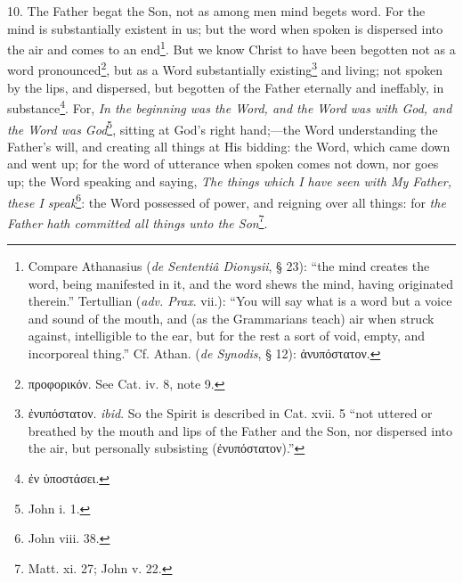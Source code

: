 10. The Father begat the Son, not as among men mind begets word. For the mind is substantially existent in us; but the word when spoken is dispersed into the air and comes to an end\footnote{Compare Athanasius (\emph{de Sententiâ Dionysii}, § 23): “the mind creates the word, being manifested in it, and the word shews the mind, having originated therein.” Tertullian (\emph{adv. Prax}. vii.): “You will say what is a word but a voice and sound of the mouth, and (as the Grammarians teach) air when struck against, intelligible to the ear, but for the rest a sort of void, empty, and incorporeal thing.” Cf. Athan. (\emph{de Synodis}, § 12): \textgreek{ἀνυπόστατον}.}. But we know Christ to have been begotten not as a word pronounced\footnote{\textgreek{προφορικόν}. See Cat. iv. 8, note 9.}, but as a Word substantially existing\footnote{\textgreek{ἐνυπόστατον}. \emph{ibid}. So the Spirit is described in Cat. xvii. 5 “not uttered or breathed by the mouth and lips of the Father and the Son, nor dispersed into the air, but personally subsisting (\textgreek{ἐνυπόστατον}).”} and living; not spoken by the lips, and dispersed, but begotten of the Father eternally and ineffably, in substance\footnote{\textgreek{ἐν ὑποστάσει}.}. For, \emph{In the beginning was the Word, and the Word was with God, and the Word was God}\footnote{John i. 1.}, sitting at God’s right hand;—the Word understanding the Father’s will, and creating all things at His bidding: the Word, which came down and went up; for the word of utterance when spoken comes not down, nor goes up; the Word speaking and saying, \emph{The things which I have seen with My Father, these I speak}\footnote{John viii. 38.}: the Word possessed of power, and reigning over all things: for \emph{the Father hath committed all things unto the Son}\footnote{Matt. xi. 27; John v. 22.}.

